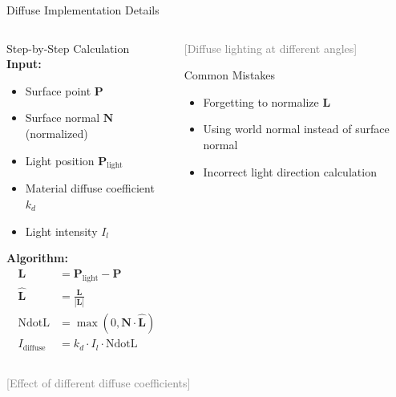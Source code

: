 \begin{frame}{Diffuse Implementation Details}
  \begin{columns}
    \begin{column}{0.6\textwidth}
      \begin{mathbox}{Step-by-Step Calculation}
        \textbf{Input:}
        \begin{itemize}
          \item Surface point $\mathbf{P}$
          \item Surface normal $\mathbf{N}$ (normalized)
          \item Light position $\mathbf{P}_{\text{light}}$
          \item Material diffuse coefficient $k_d$
          \item Light intensity $I_l$
        \end{itemize}

        \vspace{0.3cm}
        \textbf{Algorithm:}
        \begin{align}
          \mathbf{L} &= \mathbf{P}_{\text{light}} - \mathbf{P} \\
          \hat{\mathbf{L}} &= \frac{\mathbf{L}}{|\mathbf{L}|} \\
          \text{NdotL} &= \max(0, \mathbf{N} \cdot \hat{\mathbf{L}}) \\
          I_{\text{diffuse}} &= k_d \cdot I_l \cdot \text{NdotL}
        \end{align}
      \end{mathbox}
    \end{column}
    \begin{column}{0.4\textwidth}
      \pause
      \vspace{1.5cm}
      \textcolor{gray}{[Diffuse lighting at different angles]}

      \vspace{0.5cm}
      \begin{raybox}{Common Mistakes}
        \footnotesize
        \begin{itemize}
          \item Forgetting to normalize $\mathbf{L}$
          \item Using world normal instead of surface normal
          \item Incorrect light direction calculation
        \end{itemize}
      \end{raybox}
    \end{column}
  \end{columns}

  \vspace{0.3cm}
  \pause
  \textcolor{gray}{[Effect of different diffuse coefficients]}
\end{frame}

